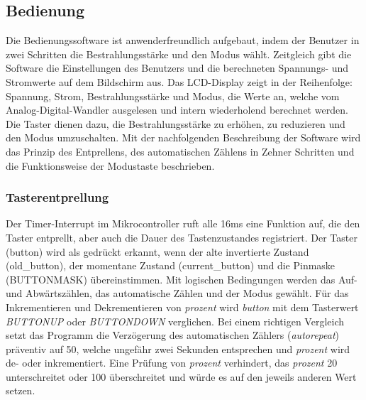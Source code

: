 \subsection{Bedienung}
Die Bedienungssoftware ist anwenderfreundlich aufgebaut, indem der Benutzer in zwei Schritten die Bestrahlungsstärke und den Modus wählt. Zeitgleich gibt die Software die Einstellungen des Benutzers und die berechneten Spannungs- und Stromwerte auf dem Bildschirm aus.
\newline
Das LCD-Display zeigt in der Reihenfolge: Spannung, Strom, Bestrahlungsstärke und Modus, die Werte an, welche vom Analog-Digital-Wandler ausgelesen und intern wiederholend berechnet werden. Die Taster dienen dazu, die Bestrahlungsstärke zu erhöhen, zu reduzieren und den Modus umzuschalten. Mit der nachfolgenden Beschreibung der Software wird das Prinzip des Entprellens, des automatischen Zählens in Zehner Schritten und die Funktionsweise der Modustaste beschrieben.

\subsubsection{Tasterentprellung}
Der Timer-Interrupt im Mikrocontroller ruft alle 16ms eine Funktion auf, die den Taster entprellt, aber auch die Dauer des Tastenzustandes registriert.
Der Taster (button) wird als gedrückt erkannt, wenn der alte invertierte Zustand (old\_button), der momentane Zustand (current\_button) und die Pinmaske (BUTTONMASK) übereinstimmen.
Mit logischen Bedingungen werden das Auf- und Abwärtszählen, das automatische Zählen und der Modus gewählt. Für das Inkrementieren und Dekrementieren von \textit{prozent} wird \textit{button} mit dem Tasterwert \textit{BUTTONUP} oder \textit{BUTTONDOWN} verglichen. Bei einem richtigen Vergleich setzt das Programm die Verzögerung des automatischen Zählers (\textit{autorepeat}) präventiv auf 50, welche ungefähr zwei Sekunden entsprechen und \textit{prozent} wird de- oder inkrementiert. Eine Prüfung von \textit{prozent} verhindert, das \textit{prozent} 20 unterschreitet oder 100 überschreitet und würde es auf den jeweils anderen Wert setzen.

